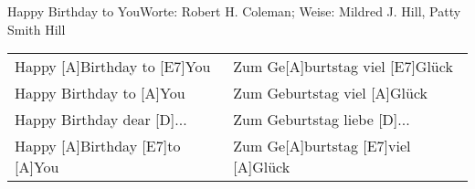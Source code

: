 \documentclass[../main.tex]{subfiles}
\begin{document}
\begin{song}[4]{Happy Birthday to You}{Worte: Robert H. Coleman; Weise: Mildred J. Hill, Patty Smith Hill}{}
\setlength{\tabcolsep}{0em}\begin{tabular}{ p{} p{} }
Happy [A]Birthday to [E7]You & Zum Ge[A]burtstag viel [E7]Glück \\
Happy Birthday to [A]You & Zum Geburtstag viel [A]Glück\\
Happy Birthday dear [D]... & Zum Geburtstag liebe [D]...\\
Happy [A]Birthday [E7]to [A]You & Zum Ge[A]burtstag [E7]viel [A]Glück
\end{tabular}
\end{song}
\end{document}
